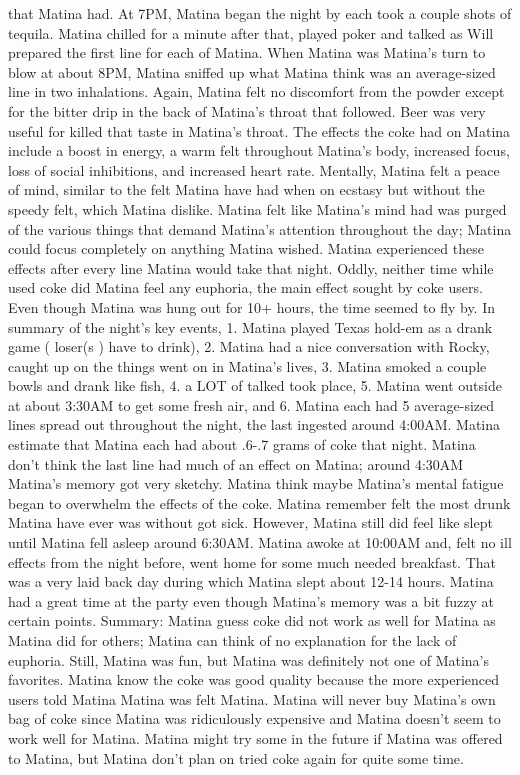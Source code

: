 \documentclass[12pt]{book}
\begin{document}
that Matina had. At 7PM, Matina began the night by each took a couple shots of tequila. Matina chilled for a minute after that, played poker and talked as Will prepared the first line for each of Matina. When Matina was Matina's turn to blow at about 8PM, Matina sniffed up what Matina think was an average-sized line in two inhalations. Again, Matina felt no discomfort from the powder except for the bitter drip in the back of Matina's throat that followed. Beer was very useful for killed that taste in Matina's throat. The effects the coke had on Matina include a boost in energy, a warm felt throughout Matina's body, increased focus, loss of social inhibitions, and increased heart rate. Mentally, Matina felt a peace of mind, similar to the felt Matina have had when on ecstasy but without the speedy felt, which Matina dislike. Matina felt like Matina's mind had was purged of the various things that demand Matina's attention throughout the day; Matina could focus completely on anything Matina wished. Matina experienced these effects after every line Matina would take that night. Oddly, neither time while used coke did Matina feel any euphoria, the main effect sought by coke users. Even though Matina was hung out for 10+ hours, the time seemed to fly by. In summary of the night's key events, 1. Matina played Texas hold-em as a drank game ( loser(s ) have to drink), 2. Matina had a nice conversation with Rocky, caught up on the things went on in Matina's lives, 3. Matina smoked a couple bowls and drank like fish, 4. a LOT of talked took place, 5. Matina went outside at about 3:30AM to get some fresh air, and 6. Matina each had 5 average-sized lines spread out throughout the night, the last ingested around 4:00AM. Matina estimate that Matina each had about .6-.7 grams of coke that night. Matina don't think the last line had much of an effect on Matina; around 4:30AM Matina's memory got very sketchy. Matina think maybe Matina's mental fatigue began to overwhelm the effects of the coke. Matina remember felt the most drunk Matina have ever was without got sick. However, Matina still did feel like slept until Matina fell asleep around 6:30AM. Matina awoke at 10:00AM and, felt no ill effects from the night before, went home for some much needed breakfast. That was a very laid back day during which Matina slept about 12-14 hours. Matina had a great time at the party even though Matina's memory was a bit fuzzy at certain points. Summary: Matina guess coke did not work as well for Matina as Matina did for others; Matina can think of no explanation for the lack of euphoria. Still, Matina was fun, but Matina was definitely not one of Matina's favorites. Matina know the coke was good quality because the more experienced users told Matina Matina was felt Matina. Matina will never buy Matina's own bag of coke since Matina was ridiculously expensive and Matina doesn't seem to work well for Matina. Matina might try some in the future if Matina was offered to Matina, but Matina don't plan on tried coke again for quite some time.
\end{document}
